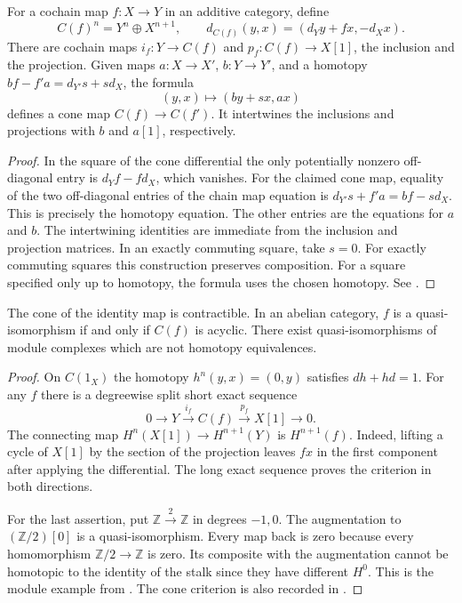 \begin{proposition}\label{res:K02}
For a cochain map \(f:X\to Y\) in an additive category, define
\[
 C(f)^n=Y^n\oplus X^{n+1},\qquad
 d_{C(f)}(y,x)=(d_Y y+f x,-d_X x).
\]
There are cochain maps \(i_f:Y\to C(f)\) and \(p_f:C(f)\to X[1]\),
the inclusion and the projection. Given maps \(a:X\to X'\), \(b:Y\to
Y'\), and a homotopy \(bf-f'a=d_{Y'}s+s d_X\), the formula
\[
 (y,x)\longmapsto (b y+s x,a x)
\]
defines a cone map \(C(f)\to C(f')\). It intertwines the inclusions and
projections with \(b\) and \(a[1]\), respectively.
\end{proposition}
\begin{proof}
In the square of the cone differential the only potentially nonzero
off-diagonal entry is \(d_Y f-f d_X\), which vanishes. For the claimed
cone map, equality of the two off-diagonal entries of the chain map
equation is \(d_{Y'}s+f'a=bf-sd_X\). This is precisely the homotopy
equation. The other entries are the equations for \(a\) and \(b\).
The intertwining identities are immediate from the inclusion and
projection matrices. In an exactly commuting square, take \(s=0\).
For exactly commuting squares this construction preserves composition.
For a square specified only up to homotopy, the formula uses the
chosen homotopy. See \cite[Tags 014E, 014F, and 08RI]{stacks-derived}.
\end{proof}

\begin{proposition}\label{res:K03}
The cone of the identity map is contractible. In an abelian category,
\(f\) is a quasi-isomorphism if and only if \(C(f)\) is acyclic.
There exist quasi-isomorphisms of module complexes which are not
homotopy equivalences.
\end{proposition}
\begin{proof}
On \(C(1_X)\) the homotopy \(h^n(y,x)=(0,y)\) satisfies
\(d h+h d=1\). For any \(f\) there is a degreewise split short exact
sequence
\[
 0\longrightarrow Y\xrightarrow{i_f} C(f)
       \xrightarrow{p_f} X[1]\longrightarrow 0.
\]
The connecting map \(H^n(X[1])\to H^{n+1}(Y)\) is \(H^{n+1}(f)\).
Indeed, lifting a cycle of \(X[1]\) by the section of the projection
leaves \(f x\) in the first component after applying the differential. The
long exact sequence proves the criterion in both directions.

For the last assertion, put \(\mathbb Z\xrightarrow{2}\mathbb Z\)
in degrees \(-1,0\). The augmentation to \((\mathbb Z/2)[0]\) is a
quasi-isomorphism. Every map back is zero because every homomorphism
\(\mathbb Z/2\to\mathbb Z\) is zero. Its composite with the augmentation
cannot be homotopic to the identity of the stalk since they have
different \(H^0\). This is the module example from
\cite[Chapter 10]{p103}. The cone criterion is also recorded in
\cite[Tag 05RT]{stacks-derived}.
\end{proof}

